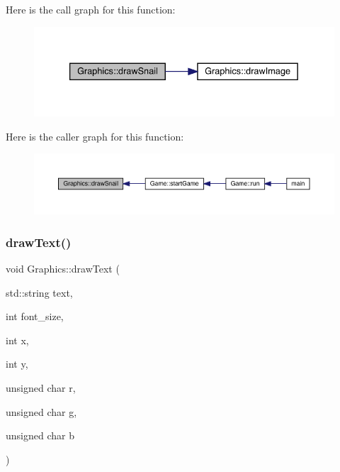 Here is the call graph for this function\+:\nopagebreak
\begin{figure}[H]
\begin{center}
\leavevmode
\includegraphics[width=333pt]{class_graphics_afce4453a05a511f4f07164d91c4ee2bf_cgraph}
\end{center}
\end{figure}
Here is the caller graph for this function\+:\nopagebreak
\begin{figure}[H]
\begin{center}
\leavevmode
\includegraphics[width=350pt]{class_graphics_afce4453a05a511f4f07164d91c4ee2bf_icgraph}
\end{center}
\end{figure}
\mbox{\label{class_graphics_a3b78a92ad6cd4daaa44291df5c5c3e55}} 
\subsubsection{\texorpdfstring{draw\+Text()}{drawText()}}
{\footnotesize\ttfamily void Graphics\+::draw\+Text (\begin{DoxyParamCaption}\item[{std\+::string}]{text,  }\item[{int}]{font\+\_\+size,  }\item[{int}]{x,  }\item[{int}]{y,  }\item[{unsigned char}]{r,  }\item[{unsigned char}]{g,  }\item[{unsigned char}]{b }\end{DoxyParamCaption})}

